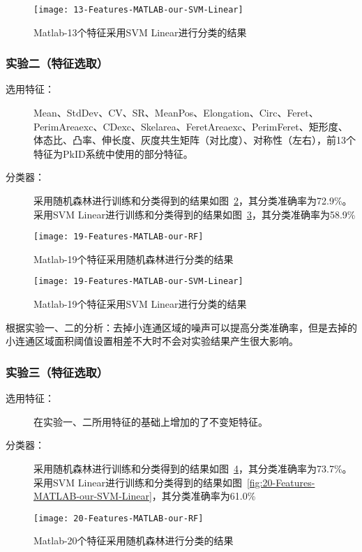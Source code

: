 \begin{figure}[!ht]
\centering
\texttt{[image: 13-Features-MATLAB-our-SVM-Linear]}
\caption{Matlab-13个特征采用SVM Linear进行分类的结果}
\label{fig:13-Features-MATLAB-our-SVM-Linear}
\end{figure}

\subsubsection{实验二（特征选取）}
\begin{description}
\item[选用特征：] Mean、StdDev、CV、SR、MeanPos、Elongation、Circ、Feret、PerimAreaexc、CDexc、Skelarea、FeretAreaexc、PerimFeret、矩形度、体态比、凸率、伸长度、灰度共生矩阵（对比度）、对称性（左右），前13个特征为PkID系统中使用的部分特征。
\item[分类器：] 采用随机森林进行训练和分类得到的结果如图~\ref{fig:19-Features-MATLAB-our-RF}，其分类准确率为72.9\%。采用SVM Linear进行训练和分类得到的结果如图~\ref{fig:19-Features-MATLAB-our-SVM-Linear}，其分类准确率为58.9\%
\end{description}
\begin{figure}[!ht]
\centering
\texttt{[image: 19-Features-MATLAB-our-RF]}
\caption{Matlab-19个特征采用随机森林进行分类的结果}
\label{fig:19-Features-MATLAB-our-RF}
\end{figure}

\begin{figure}[!ht]
\centering
\texttt{[image: 19-Features-MATLAB-our-SVM-Linear]}
\caption{Matlab-19个特征采用SVM Linear进行分类的结果}
\label{fig:19-Features-MATLAB-our-SVM-Linear}
\end{figure}
根据实验一、二的分析：去掉小连通区域的噪声可以提高分类准确率，但是去掉的小连通区域面积阈值设置相差不大时不会对实验结果产生很大影响。

\subsubsection{实验三（特征选取）}
\begin{description}
\item[选用特征：] 在实验一、二所用特征的基础上增加的了不变矩特征。
\item[分类器：] 采用随机森林进行训练和分类得到的结果如图~\ref{fig:20-Features-MATLAB-our-RF}，其分类准确率为73.7\%。采用SVM Linear进行训练和分类得到的结果如图~\ref{fig:20-Features-MATLAB-our-SVM-Linear}，其分类准确率为61.0\%
\end{description}
\begin{figure}[!ht]
\centering
\texttt{[image: 20-Features-MATLAB-our-RF]}
\caption{Matlab-20个特征采用随机森林进行分类的结果}
\label{fig:20-Features-MATLAB-our-RF}
\end{figure}

